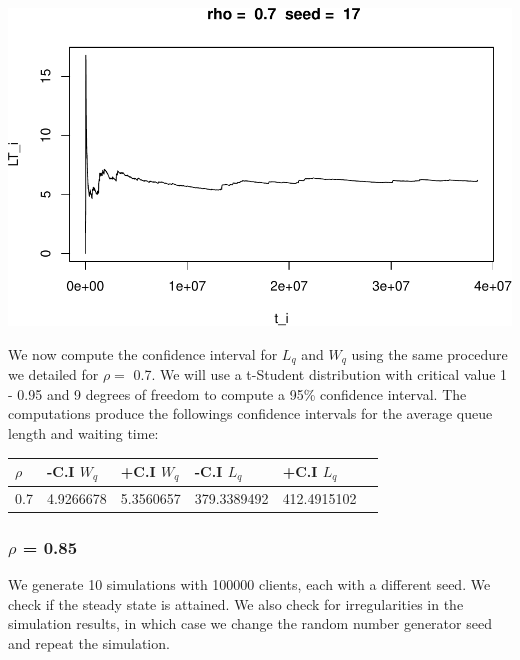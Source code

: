 \documentclass[]{article}
\begin{document}
\includegraphics{003_files/figure-latex/unnamed-chunk-18-10.pdf}

We now compute the confidence interval for \(L_{q}\) and \(W_{q}\) using
the same procedure we detailed for \(\rho =\) 0.7. We will use a
t-Student distribution with critical value 1 - 0.95 and 9 degrees of
freedom to compute a 95\% confidence interval. The computations produce
the followings confidence intervals for the average queue length and
waiting time:

\begin{longtable}[]{@{}llllll@{}}
\toprule
\(\rho\) & -C.I \(W_{q}\) & +C.I \(W_{q}\) & -C.I \(L_{q}\) & +C.I
\(L_{q}\) &\tabularnewline
\midrule
\endhead
0.7 & 4.9266678 & 5.3560657 & 379.3389492 & 412.4915102\tabularnewline
\bottomrule
\end{longtable}

\subsubsection{\texorpdfstring{\(\rho\) =
0.85}{\textbackslash{}rho = 0.85}}\label{rho-0.85}

We generate 10 simulations with 100000 clients, each with a different
seed. We check if the steady state is attained. We also check for
irregularities in the simulation results, in which case we change the
random number generator seed and repeat the simulation.
\end{document}
